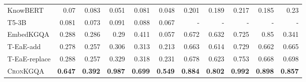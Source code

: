\documentclass[11pt,a4paper]{article}
\newcommand{\method}{\textsc{CronKGQA}}
\begin{document}
\begin{table*}[ht!]
{\begin{tabular}{l|r|rr|rr|rrrrr}
KnowBERT                                             & 0.07                                                  & 0.083                                 & 0.051                                & 0.081                                & 0.048                              & \multicolumn{1}{r|}{0.201}                              & 0.189                                 & \multicolumn{1}{r|}{0.217}           & 0.185                                & 0.23                             \\
T5-3B                                                & 0.081                                                  & 0.073                                 & 0.091                                & 0.088                                & 0.067                              & \multicolumn{1}{r|}{-}                                 & -                                     & \multicolumn{1}{r|}{-}               & -                                    & -                                 \\ \hline
EmbedKGQA                                            & 0.288                                                   & 0.286                                  & 0.29                                & { 0.411}                          & 0.057                              & \multicolumn{1}{r|}{0.672}                             & 0.632                                 & \multicolumn{1}{r|}{0.725}           & {0.85}                          & 0.341                             \\
T-EaE-add                                              & 0.278                                                   & 0.257                                  & 0.306                                & 0.313                                & 0.213                               & \multicolumn{1}{r|}{0.663}                             & 0.614                                 & \multicolumn{1}{r|}{0.729}           & 0.662                                & 0.665                             \\
T-EaE-replace                                          & { 0.288}                                            & { 0.257}                           & { 0.329}                          & 0.318                                & { 0.231}                        & \multicolumn{1}{r|}{{ 0.678}}                       & { 0.623}                           & \multicolumn{1}{r|}{{ 0.753}}     & 0.668                                & { 0.698}                       \\
\method{}                                          & \textbf{0.647}                                         & \textbf{0.392}                        & \textbf{0.987}                       & \textbf{0.699}                       & \textbf{0.549}                     & \multicolumn{1}{r|}{\textbf{0.884}}                    & \textbf{0.802}                        & \multicolumn{1}{r|}{\textbf{0.992}}  & \textbf{0.898}                       & \textbf{0.857}                   

\end{tabular}}
\end{table*}
\end{document}
